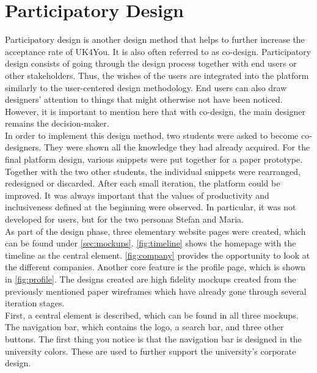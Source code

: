 \section{Participatory Design}
Participatory design is another design method that helps to further increase the acceptance rate of UK4You\cite{participatory-design-spinuzzi}.
It is also often referred to as co-design. 
Participatory design consists of going through the design process together with end users or other stakeholders.
Thus, the wishes of the users are integrated into the platform similarly to the user-centered design methodology.
End users can also draw designers' attention to things that might otherwise not have been noticed.
However, it is important to mention here that with co-design, the main designer remains the decision-maker.\\

In order to implement this design method, two students were asked to become co-designers.
They were shown all the knowledge they had already acquired.
For the final platform design, various snippets were put together for a paper prototype.
Together with the two other students, the individual snippets were rearranged, redesigned or discarded.
After each small iteration, the platform could be improved.
It was always important that the values of productivity and inclusiveness defined at the beginning were observed.
In particular, it was not developed for users, but for the two personas Stefan and Maria.\\

As part of the design phase, three elementary website pages were created, which can be found under \autoref{sec:mockups}.
\autoref{fig:timeline} shows the homepage with the timeline as the central element. 
\autoref{fig:company} provides the opportunity to look at the different companies.
Another core feature is the profile page, which is shown in \autoref{fig:profile}.
The designs created are high fidelity mockups created from the previously mentioned paper wireframes which have already gone through several iteration stages.\\

First, a central element is described, which can be found in all three mockups.
The navigation bar, which contains the logo, a search bar, and three other buttons.
The first thing you notice is that the navigation bar is designed in the university colors\cite{uni-kassel-colors}.
These are used to further support the university's corporate design.\\

